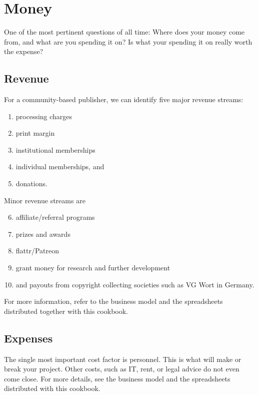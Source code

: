 \documentclass[nonflat,smallfont
]{langsci/langscibook}
\begin{document}
\section{Money}\label{sec:money}
One of the most pertinent questions of all time: Where does your money come from, and what are you spending it on? Is what your spending it on really worth the expense? 
\subsection{Revenue}
For a community-based publisher, we can identify five major revenue streams: 
\begin{enumerate}
 \item processing charges
 \item print margin
 \item institutional memberships
 \item individual memberships, and  
 \item donations.
\end{enumerate}

\noindent 
Minor revenue streams are 
\begin{enumerate}
\setcounter{enumi}{5}
 \item affiliate/referral programs
 \item prizes and awards
 \item flattr/Patreon
 \item  grant money for research and further development
 \item and payouts from copyright collecting societies such as VG Wort in Germany. 
\end{enumerate}
 
For more information, refer to the business model and the spreadsheets distributed together with this cookbook. 

\subsection{Expenses}
The single most important cost factor is personnel.  This is what will make or break your project. Other costs, such as IT, rent, or legal advice do not even come close. For more details, see the business model and the spreadsheets distributed with this cookbook. 

\end{document}

